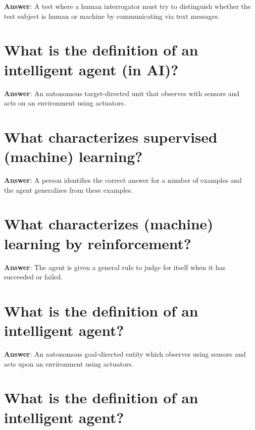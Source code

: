 \documentclass[a4paper,11pt,oneside]{book}
\begin{document}
\begin{sloppypar}
\label{q:322:sa:en:True}

\textbf{Answer}: A test where a human interrogator must try to distinguish whether the test subject is human or machine by communicating via text messages.



\section{What is the definition of an intelligent agent (in AI)?}

\label{q:323:sa:en:True}

\textbf{Answer}: An autonomous target-directed unit that observes with sensors and acts on an environment using actuators.



\section{What characterizes supervised (machine) learning?}

\label{q:324:sa:en:True}

\textbf{Answer}: A person identifies the correct answer for a number of examples and the agent generalizes from these examples.



\section{What characterizes (machine) learning by reinforcement?}

\label{q:325:sa:en:True}

\textbf{Answer}: The agent is given a general rule to judge for itself when it has succeeded or failed.



\section{What is the definition of an intelligent agent?}

\label{q:326:sa:en:True}

\textbf{Answer}: An autonomous goal-directed entity which observes using sensors and acts upon an environment using actuators.



\section{What is the definition of an intelligent agent?}


\end{sloppypar}
\end{document}
